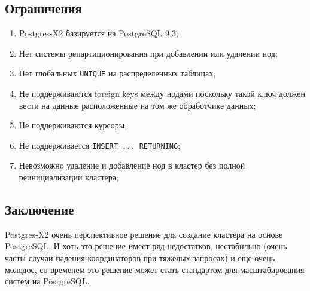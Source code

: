 \subsection{Ограничения}

\begin{enumerate}
  \item Postgres-X2 базируется на PostgreSQL 9.3;
  \item Нет системы репартиционирования при добавлении или удалении нод;
  \item Нет глобальных \lstinline!UNIQUE! на распределенных таблицах;
  \item Не поддерживаются foreign keys между нодами поскольку такой ключ должен вести на данные расположенные на том же обработчике данных;
  \item Не поддерживаются курсоры;
  \item Не поддерживается \lstinline!INSERT ... RETURNING!;
  \item Невозможно удаление и добавление нод в кластер без полной реинициализации кластера;
\end{enumerate}

\subsection{Заключение}

Postgres-X2 очень перспективное решение для создание кластера на основе PostgreSQL. И хоть это решение имеет ряд недостатков, нестабильно (очень часты случаи падения координаторов при тяжелых запросах) и еще очень молодое, со временем это решение может стать стандартом для масштабирования систем на PostgreSQL.
